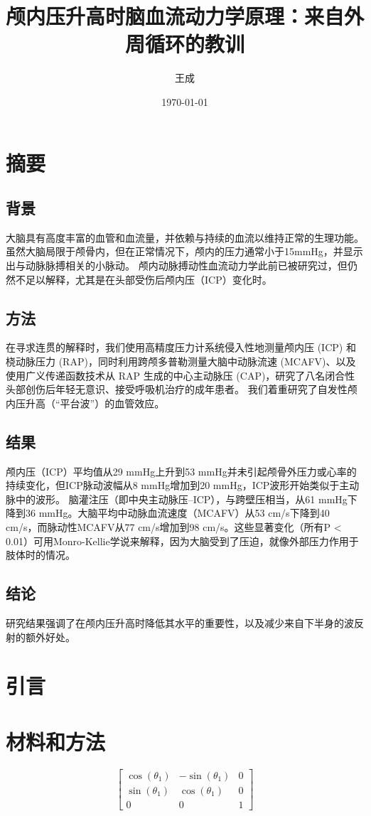 \documentclass[12pt]{article}
\title{颅内压升高时脑血流动力学原理：来自外周循环的教训}
\author{王成}
\date{\today}
\begin{document}
\maketitle
\newpage

\tableofcontents
\newpage

\section{摘要}
\subsection{背景}
大脑具有高度丰富的血管和血流量，并依赖与持续的血流以维持正常的生理功能。
虽然大脑局限于颅骨内，但在正常情况下，颅内的压力通常小于15mmHg，并显示出与动脉脉搏相关的小脉动。
颅内动脉搏动性血流动力学此前已被研究过，但仍然不足以解释，尤其是在头部受伤后颅内压（ICP）变化时。

\subsection{方法}
在寻求连贯的解释时，我们使用高精度压力计系统侵入性地测量颅内压 (ICP) 和桡动脉压力 (RAP)，同时利用跨颅多普勒测量大脑中动脉流速 (MCAFV)、以及使用广义传递函数技术从 R​​AP 生成的中心主动脉压 (CAP)，研究了八名闭合性头部创伤后年轻无意识、接受呼吸机治疗的成年患者。
我们着重研究了自发性颅内压升高（“平台波”）的血管效应。

\subsection{结果}
颅内压（ICP）平均值从29 mmHg上升到53 mmHg并未引起颅骨外压力或心率的持续变化，但ICP脉动波幅从8 mmHg增加到20 mmHg，ICP波形开始类似于主动脉中的波形。
脑灌注压（即中央主动脉压–ICP），与跨壁压相当，从61 mmHg下降到36 mmHg。大脑平均中动脉血流速度（MCAFV）从53 cm/s下降到40 cm/s，而脉动性MCAFV从77 cm/s增加到98 cm/s。这些显著变化（所有P < 0.01）可用Monro-Kellie学说来解释，因为大脑受到了压迫，就像外部压力作用于肢体时的情况。

\subsection{结论}
研究结果强调了在颅内压升高时降低其水平的重要性，以及减少来自下半身的波反射的额外好处。

\section{引言}

\section{材料和方法}

\begin{equation}
    \begin{bmatrix}\cos{\left(\theta_{1} \right)} & - \sin{\left(\theta_{1} \right)} & 0\\\sin{\left(\theta_{1} \right)} & \cos{\left(\theta_{1} \right)} & 0\\0 & 0 & 1\end{bmatrix}
\end{equation}
\end{document}
